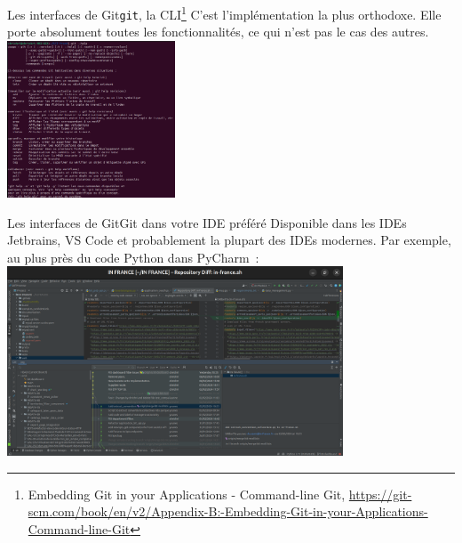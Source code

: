 \documentclass{beamer}
\begin{document}
    \begin{frame}{Les interfaces de Git}{\lstinline{git}, la CLI\footnote{Embedding Git in your Applications - Command-line Git, \url{https://git-scm.com/book/en/v2/Appendix-B:-Embedding-Git-in-your-Applications-Command-line-Git}}}
        \transdissolve
        C'est l'implémentation la plus orthodoxe.
        Elle porte absolument toutes les fonctionnalités, ce qui n'est pas le cas des autres.
        \bigbreak
        \centering
        \includegraphics[width=5cm]{image/git-cli-help}
    \end{frame}

    \begin{frame}{Les interfaces de Git}{Git dans votre IDE préféré}
        \transdissolve
        Disponible dans les IDEs Jetbrains, VS Code et probablement la plupart des IDEs modernes.
        Par exemple, au plus près du code Python dans PyCharm~:
        \bigbreak
        \centering
        \includegraphics[width=10cm]{image/git-in-pycharm}
    \end{frame}
\end{document}

